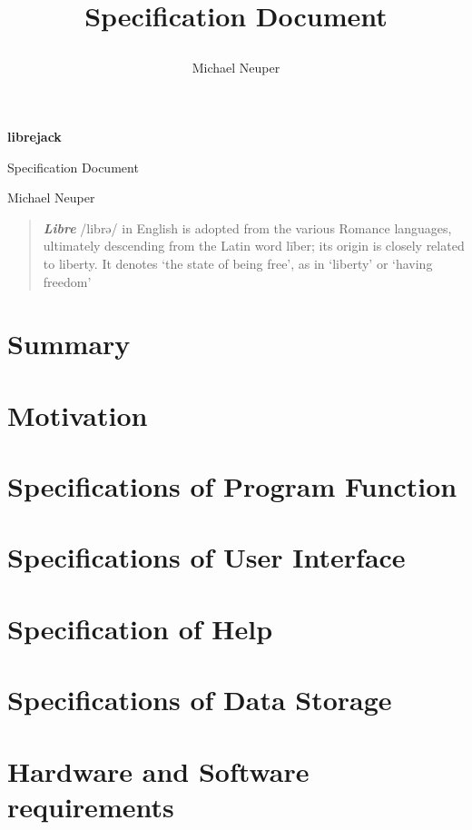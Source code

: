 \documentclass[12pt]{article}
\title{
    \begin{huge}
		Specification Document
	\end{huge}
\author{Michael Neuper}}
\date{}
\begin{document}
	
\begin{titlepage}
		\centering
		\vspace*{\fill}
		
		\vspace*{0.5cm}
		
		\Huge\bfseries
		librejack
		
		\LARGE Specification Document
		
		\vspace*{0.5cm}
		
		\Large Michael Neuper
		
		\vspace{6cm}
	
		\begin{quote}
			\large
			
			\textbf{\textit{Libre}} /librə/ in English is adopted from the various Romance languages, ultimately descending from the Latin word līber; its origin is closely related to liberty. It denotes `the state of being free', as in `liberty' or `having freedom'
		\end{quote}
		
		\vspace*{\fill}
\end{titlepage}

\tableofcontents
\pagebreak

\section{Summary}

\section{Motivation}

\section{Specifications of Program Function}

\section{Specifications of User Interface}

\section{Specification of Help}

\section{Specifications of Data Storage}

\section{Hardware and Software requirements}
\end{document}
